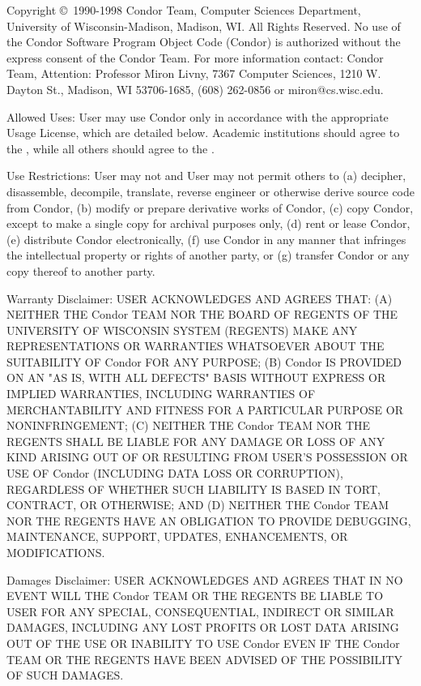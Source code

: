 Copyright \copyright\ 1990-1998 Condor Team, Computer Sciences
Department, University of Wisconsin-Madison, Madison, WI. All Rights
Reserved. No use of the Condor Software Program Object Code (Condor)
is authorized without the express consent of the Condor Team. For more
information contact: Condor Team, Attention: Professor Miron Livny,
7367 Computer Sciences, 1210 W. Dayton St., Madison, WI 53706-1685,
(608) 262-0856 or miron@cs.wisc.edu. 

Allowed Uses: User may use Condor only in accordance with the
appropriate Usage License, which are detailed below.  Academic
institutions should agree to the , while all others should agree to the .

Use Restrictions: User may not and User may not permit others to (a)
decipher, disassemble, decompile, translate, reverse engineer or
otherwise derive source code from Condor, (b) modify or prepare
derivative works of Condor, (c) copy Condor, except to make a single
copy for archival purposes only, (d) rent or lease Condor, (e)
distribute Condor electronically, (f) use Condor in any manner that
infringes the intellectual property or rights of another party, or (g)
transfer Condor or any copy thereof to another party. 

Warranty Disclaimer: USER ACKNOWLEDGES AND AGREES THAT: (A) NEITHER
THE Condor TEAM NOR THE BOARD OF REGENTS OF THE UNIVERSITY OF
WISCONSIN SYSTEM (REGENTS) MAKE ANY REPRESENTATIONS OR WARRANTIES
WHATSOEVER ABOUT THE SUITABILITY OF Condor FOR ANY PURPOSE; (B) Condor
IS PROVIDED ON AN "AS IS, WITH ALL DEFECTS" BASIS WITHOUT EXPRESS OR
IMPLIED WARRANTIES, INCLUDING WARRANTIES OF MERCHANTABILITY AND
FITNESS FOR A PARTICULAR PURPOSE OR NONINFRINGEMENT; (C) NEITHER THE
Condor TEAM NOR THE REGENTS SHALL BE LIABLE FOR ANY DAMAGE OR LOSS OF
ANY KIND ARISING OUT OF OR RESULTING FROM USER'S POSSESSION OR USE
OF Condor (INCLUDING DATA LOSS OR CORRUPTION), REGARDLESS OF WHETHER
SUCH LIABILITY IS BASED IN TORT, CONTRACT, OR OTHERWISE; AND (D)
NEITHER THE Condor TEAM NOR THE REGENTS HAVE AN OBLIGATION TO PROVIDE
DEBUGGING, MAINTENANCE, SUPPORT, UPDATES, ENHANCEMENTS, OR
MODIFICATIONS. 

Damages Disclaimer: USER ACKNOWLEDGES AND AGREES THAT IN NO EVENT WILL
THE Condor TEAM OR THE REGENTS BE LIABLE TO USER FOR ANY SPECIAL,
CONSEQUENTIAL, INDIRECT OR SIMILAR DAMAGES, INCLUDING ANY LOST PROFITS
OR LOST DATA ARISING OUT OF THE USE OR INABILITY TO USE Condor EVEN IF
THE Condor TEAM OR THE REGENTS HAVE BEEN ADVISED OF THE POSSIBILITY OF
SUCH DAMAGES. 

